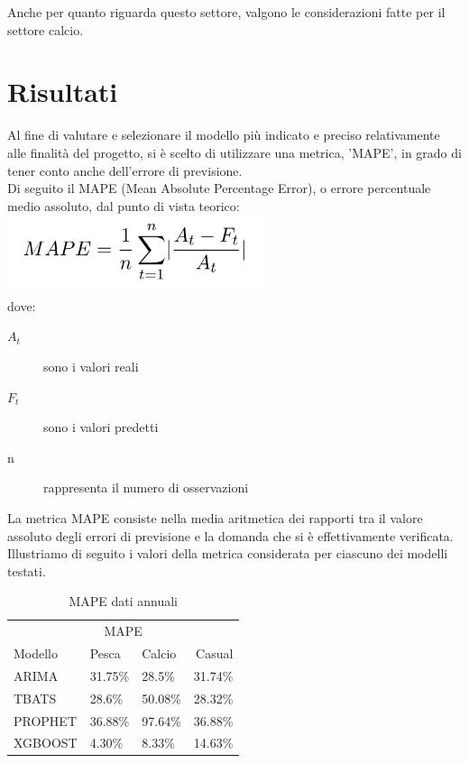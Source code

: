 \documentclass[12pt, a4paper, twocolumn]{article} %
\begin{document}
Anche per quanto riguarda questo settore, valgono le considerazioni fatte per il settore calcio.

\section{Risultati}
Al fine di valutare e selezionare il modello più indicato e preciso relativamente alle finalità del progetto, si è scelto di utilizzare una metrica, 'MAPE', in grado di tener conto anche dell'errore di previsione.\\
Di seguito il MAPE (Mean Absolute Percentage Error), o errore percentuale medio assoluto, dal punto di vista teorico:\\
\includegraphics[width=75mm,scale=0.5]{mape.png}
\\
dove:
\begin{description}
	\item[$A_t$] sono i valori reali
	\item[$F_t$] sono i valori predetti
	\item[n] rappresenta il numero di osservazioni
\end{description}

La metrica MAPE consiste nella media aritmetica dei rapporti tra il valore assoluto degli errori di previsione e la domanda che si è effettivamente verificata.\\
Illustriamo di seguito i valori della metrica considerata per ciascuno dei modelli testati.

\begin{table}[H]
\caption{MAPE dati annuali}
\centering
	\begin{tabular}{lllr}
		\toprule
		\multicolumn{4}{c}{MAPE} \\
		\cmidrule(r){2-4}
			Modello & Pesca & Calcio & Casual \\
		\midrule
			ARIMA & 31.75\% & 28.5\% & 31.74\% \\
			TBATS & 28.6\% & 50.08\% & 28.32\% \\
			PROPHET & 36.88\% & 97.64\% & 36.88\% \\
			XGBOOST & 4.30\% & 8.33\% & 14.63\% \\
		\bottomrule
	\end{tabular}
\end{table}
\end{document}
